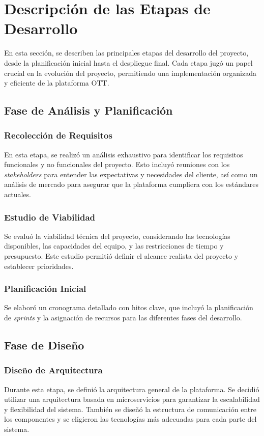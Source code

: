 \section{Descripción de las Etapas de Desarrollo}
En esta sección, se describen las principales etapas del desarrollo del proyecto, 
desde la planificación inicial hasta el despliegue final. Cada etapa jugó un papel 
crucial en la evolución del proyecto, permitiendo una implementación organizada y eficiente de la plataforma OTT.

\subsection{Fase de Análisis y Planificación}
\subsubsection{Recolección de Requisitos}
En esta etapa, se realizó un análisis exhaustivo para identificar los requisitos 
funcionales y no funcionales del proyecto. Esto incluyó reuniones con los \textit{stakeholders} 
para entender las expectativas y necesidades del cliente, así como un análisis de mercado para
 asegurar que la plataforma cumpliera con los estándares actuales.


\subsubsection{Estudio de Viabilidad}
Se evaluó la viabilidad técnica del proyecto, considerando las tecnologías disponibles, 
las capacidades del equipo, y las restricciones de tiempo y presupuesto. Este estudio 
permitió definir el alcance realista del proyecto y establecer prioridades.

\subsubsection{Planificación Inicial}
Se elaboró un cronograma detallado con hitos clave, que incluyó la planificación de \textit{sprints} 
y la asignación de recursos para las diferentes fases del desarrollo.

\subsection{Fase de Diseño}
\subsubsection{Diseño de Arquitectura}
Durante esta etapa, se definió la arquitectura general de la plataforma. Se decidió utilizar 
una arquitectura basada en microservicios para garantizar la escalabilidad y flexibilidad del 
sistema. También se diseñó la estructura de comunicación entre los componentes y se eligieron 
las tecnologías más adecuadas para cada parte del sistema.

